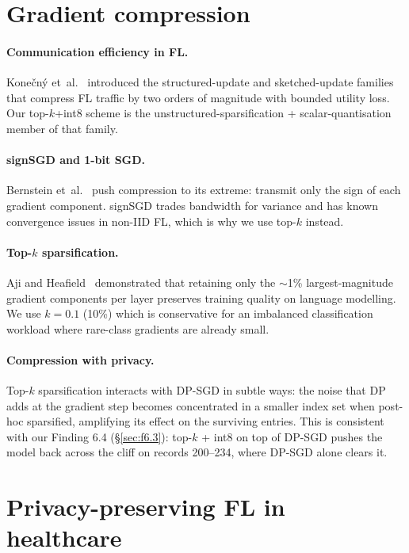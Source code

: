 \documentclass[11pt,a4paper]{report}
\begin{document}
\section{Gradient compression}\label{sec:rw-compress}

\paragraph{Communication efficiency in FL.} Konečný
et~al.~\cite{konecny2016fedlearning} introduced the structured-update and
sketched-update families that compress FL traffic by two orders of
magnitude with bounded utility loss. Our top-$k$+int8 scheme is the
unstructured-sparsification + scalar-quantisation member of that family.

\paragraph{signSGD and 1-bit SGD.} Bernstein
et~al.~\cite{bernstein2018signsgd} push compression to its extreme:
transmit only the sign of each gradient component. signSGD trades
bandwidth for variance and has known convergence issues in non-IID FL,
which is why we use top-$k$ instead.

\paragraph{Top-$k$ sparsification.} Aji and
Heafield~\cite{aji2017topk} demonstrated that retaining only the
$\sim$1\% largest-magnitude gradient components per layer preserves
training quality on language modelling. We use $k = 0.1$ (10\%) which is
conservative for an imbalanced classification workload where rare-class
gradients are already small.

\paragraph{Compression with privacy.} Top-$k$ sparsification interacts
with DP-SGD in subtle ways: the noise that DP adds at the gradient step
becomes concentrated in a smaller index set when post-hoc sparsified,
amplifying its effect on the surviving entries. This is consistent with
our Finding 6.4 (\S\ref{sec:f6.3}): top-$k$ + int8 on top of DP-SGD pushes
the model back across the cliff on records 200--234, where DP-SGD alone
clears it.

\section{Privacy-preserving FL in healthcare}\label{sec:rw-health}
\end{document}
